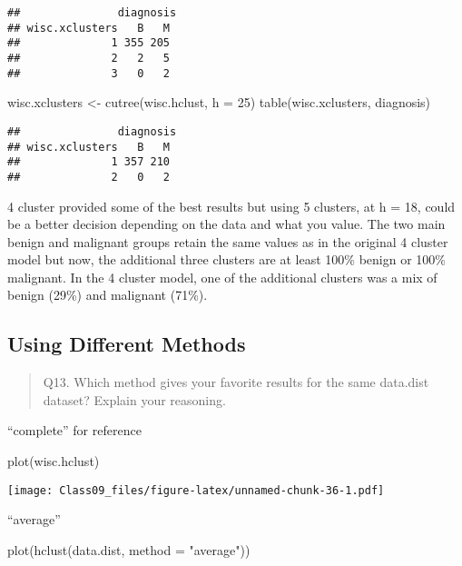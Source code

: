 \documentclass[
]{article}
\newenvironment{Shaded}{\begin{snugshade}}{\end{snugshade}}
\newcommand{\AttributeTok}[1]{\textcolor[rgb]{0.77,0.63,0.00}{#1}}
\newcommand{\DecValTok}[1]{\textcolor[rgb]{0.00,0.00,0.81}{#1}}
\newcommand{\FunctionTok}[1]{\textcolor[rgb]{0.00,0.00,0.00}{#1}}
\newcommand{\NormalTok}[1]{#1}
\newcommand{\OtherTok}[1]{\textcolor[rgb]{0.56,0.35,0.01}{#1}}
\newcommand{\StringTok}[1]{\textcolor[rgb]{0.31,0.60,0.02}{#1}}
\begin{document}
\begin{verbatim}
##               diagnosis
## wisc.xclusters   B   M
##              1 355 205
##              2   2   5
##              3   0   2
\end{verbatim}

\begin{Shaded}
\begin{Highlighting}[]
\NormalTok{wisc.xclusters }\OtherTok{\textless{}{-}} \FunctionTok{cutree}\NormalTok{(wisc.hclust, }\AttributeTok{h =} \DecValTok{25}\NormalTok{)}
\FunctionTok{table}\NormalTok{(wisc.xclusters, diagnosis)}
\end{Highlighting}
\end{Shaded}

\begin{verbatim}
##               diagnosis
## wisc.xclusters   B   M
##              1 357 210
##              2   0   2
\end{verbatim}

4 cluster provided some of the best results but using 5 clusters, at h =
18, could be a better decision depending on the data and what you value.
The two main benign and malignant groups retain the same values as in
the original 4 cluster model but now, the additional three clusters are
at least 100\% benign or 100\% malignant. In the 4 cluster model, one of
the additional clusters was a mix of benign (29\%) and malignant (71\%).

\hypertarget{using-different-methods}{%
\subsection{Using Different Methods}\label{using-different-methods}}

\begin{quote}
Q13. Which method gives your favorite results for the same data.dist
dataset? Explain your reasoning.
\end{quote}

``complete'' for reference

\begin{Shaded}
\begin{Highlighting}[]
\FunctionTok{plot}\NormalTok{(wisc.hclust)}
\end{Highlighting}
\end{Shaded}

\texttt{[image: Class09\_files/figure-latex/unnamed-chunk-36-1.pdf]}

``average''

\begin{Shaded}
\begin{Highlighting}[]
\FunctionTok{plot}\NormalTok{(}\FunctionTok{hclust}\NormalTok{(data.dist, }\AttributeTok{method =} \StringTok{"average"}\NormalTok{))}
\end{Highlighting}
\end{Shaded}
\end{document}
